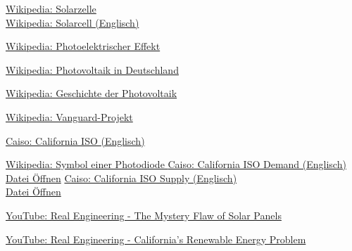 \newpage
\begin{thebibliography}{9}
        \href{https://de.wikipedia.org/wiki/Solarzelle}{
            Wikipedia: Solarzelle
        }\\
        \href{https://en.wikipedia.org/wiki/Solar_cell}{
            Wikipedia: Solarcell (Englisch)
        }

        \href{https://de.wikipedia.org/wiki/Photoelektrischer_Effekt}{
            Wikipedia: Photoelektrischer Effekt
        }

        \href{https://de.wikipedia.org/wiki/Photovoltaik_in_Deutschland}{
            Wikipedia: Photovoltaik in Deutschland
        }

        \href{https://de.wikipedia.org/wiki/Geschichte_der_Photovoltaik}{
            Wikipedia: Geschichte der Photovoltaik
        }

        \href{https://de.wikipedia.org/wiki/Vanguard-Projekt}{
            Wikipedia: Vanguard-Projekt
        }

        \href{http://www.caiso.com/TodaysOutlook/Pages/index.html}{
            Caiso: California ISO (Englisch)
        }

        \href{https://de.wikipedia.org/wiki/Datei:Symbol_Photodiode.svg}{
            Wikipedia: Symbol einer Photodiode
        }
        \href{http://www.caiso.com/TodaysOutlook/Pages/index.html}{
            Caiso: California ISO Demand (Englisch)
        }\\
        \href{run:./images/calfornia_demand_2020-08-01.pdf}{Datei Öffnen}
        \href{http://www.caiso.com/TodaysOutlook/Pages/supply.html}{
            Caiso: California ISO Supply (Englisch)
        }\\
        \href{run:./images/calfornia_supply_2020-08-01.pdf}{Datei Öffnen}

        \href{https://www.youtube.com/watch?v=yVOnHWnLSeU}{
            YouTube: Real Engineering - The Mystery Flaw of Solar Panels
        }

        \href{https://www.youtube.com/watch?v=h5cm7HOAqZY}{
            YouTube: Real Engineering - California's Renewable Energy Problem
        }
\end{thebibliography}
